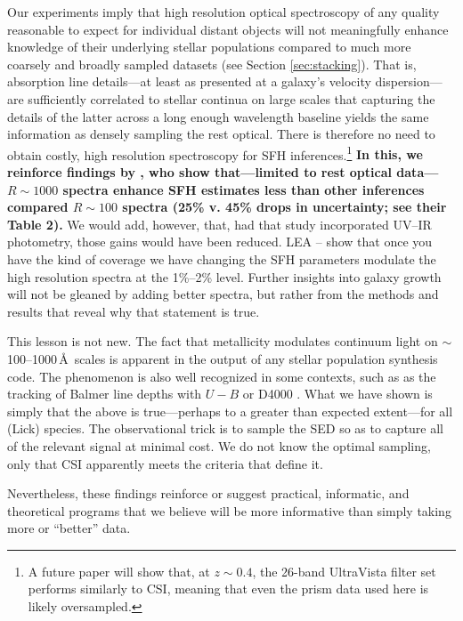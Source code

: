 \documentclass[a4paper,fleqn,usenatbib]{mnras}
\newcommand{\bfr}{\bf\color{red}}
\newcommand{\bfb}{\color{myblue}}
\begin{document}
Our experiments imply that high resolution optical spectroscopy of any quality reasonable
to expect for individual distant objects will not meaningfully 
enhance knowledge of their underlying stellar populations compared to much more coarsely and broadly 
sampled datasets (see Section \ref{sec:stacking}). That is, absorption line 
details---at least as presented at a galaxy's velocity dispersion---are sufficiently correlated to 
stellar continua on large scales that capturing the details 
of the latter across a long enough wavelength baseline yields the same information as 
densely sampling the rest optical. There is therefore no need to obtain 
costly, high resolution spectroscopy for SFH inferences.\footnote{A future 
paper will show that, at $z\sim0.4$, the 26-band UltraVista filter set \citep{Muzzin13} performs 
similarly to CSI, meaning that even the prism data used here is likely oversampled.}
{\bfr In this, we reinforce findings by \citet{Pacifici12}, who show that---limited to 
rest optical data---$R\sim1000$ spectra enhance SFH estimates less than other inferences 
compared $R\sim100$ spectra (25\% v. 45\% drops in uncertainty; see their Table 2).} 
We would add, however, that, had that study incorporated UV--IR photometry, 
those gains would have been reduced. {\bfb LEA -- \citep{Leja19, Lower20} show that once you have
the kind of coverage we have changing the SFH parameters modulate the high resolution
spectra at the 1\%--2\% level.}
Further insights into galaxy growth will not be gleaned by adding better spectra, but rather
from the methods and results that reveal why that statement is true.

This lesson is not new. The fact that 
metallicity modulates continuum light on $\sim$100--1000\,\AA\ scales is apparent in the
output of any stellar population synthesis code. The phenomenon is also well recognized in 
some contexts, such as as the tracking of Balmer line depths with $U-B$ or D4000 
\citep[e.g.,][]{Kauffmann03,CidFernandes05}. What we have shown is simply that the above is true---perhaps
to a greater than expected extent---for all (Lick) species. The observational trick is to sample the 
SED so as to capture all of the relevant signal at minimal cost. We do not know the optimal sampling,
 only that CSI apparently meets the criteria that define it.

Nevertheless, these findings reinforce or suggest practical, informatic, and 
theoretical programs that we believe will be more informative than simply taking more or
``better'' data.
\end{document}
